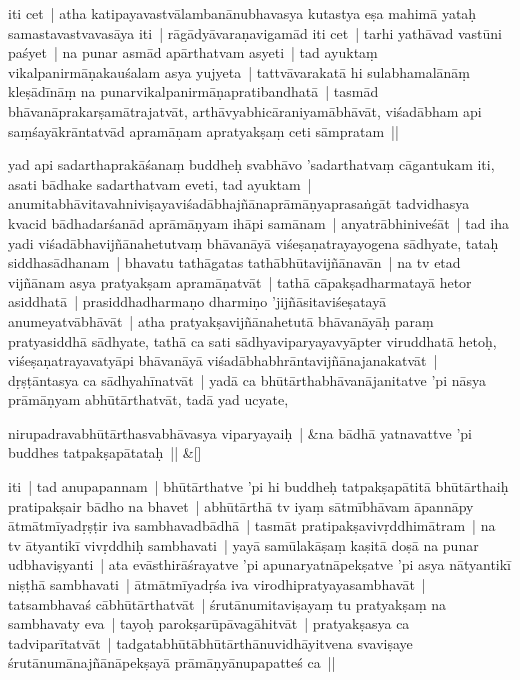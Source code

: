 \documentclass[article,12pt,a4paper]{memoir}%
\newcounter{parCount}
\begin{document}
	  
	  

	  \pstart \leavevmode%
	iti cet | atha katipayavastvālambanānubhavasya kutastya eṣa mahimā yataḥ samastavastvavasāya iti | rāgādyāvaraṇavigamād iti cet | tarhi yathāvad vastūni paśyet | na punar asmād apārthatvam asyeti | tad ayuktaṃ vikalpanirmāṇakauśalam asya yujyeta | tattvāvarakatā hi sulabhamalānāṃ kleṣādīnāṃ na punarvikalpanirmāṇapratibandhatā | tasmād bhāvanāprakarṣamātrajatvāt, arthāvyabhicāraniyamābhāvāt, viśadābham api saṃśayākrāntatvād apramāṇam apratyakṣaṃ ceti sāmpratam || 
	{}
	\pend%
      

	  \pstart \leavevmode%
	\label{thakur75-13.1}yad api sadarthaprakāśanaṃ buddheḥ svabhāvo 'sadarthatvaṃ cāgantukam iti, asati bādhake sadarthatvam eveti, tad ayuktam | anumitabhāvitavahniviṣayaviśadābhajñānaprāmāṇyaprasaṅgāt tadvidhasya kvacid bādhadarśanād aprāmāṇyam ihāpi samānam | anyatrābhiniveśāt | tad iha yadi viśadābhavijñānahetutvaṃ bhāvanāyā viśeṣaṇatrayayogena sādhyate, tataḥ siddhasādhanam | bhavatu tathāgatas tathābhūtavijñānavān | na tv etad vijñānam asya pratyakṣam apramāṇatvāt | tathā cāpakṣadharmatayā hetor asiddhatā | prasiddhadharmaṇo dharmiṇo 'jijñāsitaviśeṣatayā anumeyatvābhāvāt | atha pratyakṣavijñānahetutā bhāvanāyāḥ paraṃ pratyasiddhā sādhyate, tathā ca sati sādhyaviparyayavyāpter viruddhatā hetoḥ, viśeṣaṇatrayavatyāpi bhāvanāyā viśadābhabhrāntavijñānajanakatvāt | dṛṣṭāntasya ca sādhyahīnatvāt | yadā ca bhūtārthabhāvanājanitatve 'pi nāsya prāmāṇyam abhūtārthatvāt, tadā yad ucyate, 
	{}
	\pend%
      
	    
	    \stanza[\smallbreak]
	  nirupadravabhūtārthasvabhāvasya viparyayaiḥ | &na bādhā yatnavattve 'pi buddhes tatpakṣapātataḥ || \&[\smallbreak]
	  
	  
	  

	  \pstart \leavevmode%
	iti | tad anupapannam | bhūtārthatve 'pi hi buddheḥ tatpakṣapātitā bhūtārthaiḥ pratipakṣair bādho na bhavet | abhūtārthā tv iyaṃ sātmībhāvam āpannāpy ātmātmīyadṛṣṭir iva sambhavadbādhā | tasmāt pratipakṣavivṛddhimātram | na tv ātyantikī vivṛddhiḥ sambhavati | yayā samūlakāṣaṃ kaṣitā doṣā na punar udbhaviṣyanti | ata evāsthirāśrayatve 'pi apunaryatnāpekṣatve 'pi asya nātyantikī niṣṭhā sambhavati | ātmātmīyadṛśa iva virodhipratyayasambhavāt | tatsambhavaś cābhūtārthatvāt | śrutānumitaviṣayaṃ tu pratyakṣaṃ na sambhavaty eva | tayoḥ parokṣarūpāvagāhitvāt | pratyakṣasya ca tadviparītatvāt | tadgatabhūtābhūtārthānuvidhāyitvena svaviṣaye śrutānumānajñānāpekṣayā prāmāṇyānupapatteś ca || 
	{}
	\pend%
      
\end{document}
